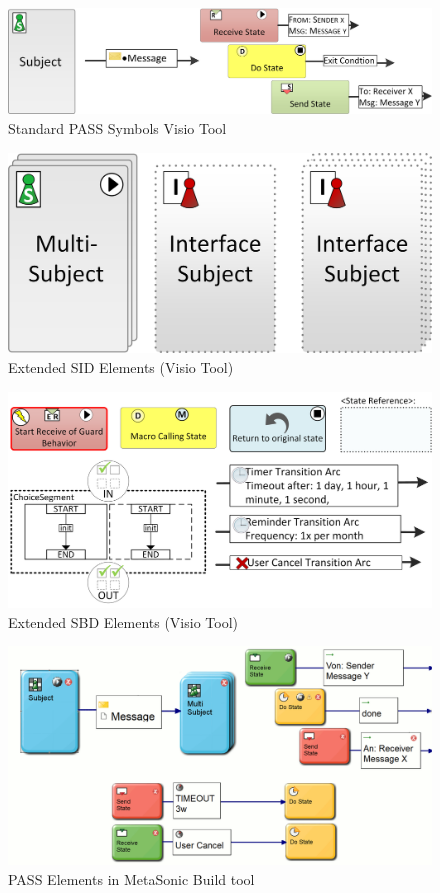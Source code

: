 \begin{figure}[htbp]
	\centering
	\includegraphics[width=0.9\linewidth]{Figures/Ontology/BaseElementsOverviewVisio.png}
	\caption[Standard PASS Symbols Visio Tool]{Standard PASS Symbols Visio Tool}
\end{figure}

\begin{figure}[htbp]
	\centering
	\includegraphics[width=0.45\linewidth]{Figures/Ontology/ExtendedElementsSIDVisio.png}
	\caption[Extended SID Elements (Visio Tool)]{Extended SID Elements (Visio Tool)}
\end{figure}

\begin{figure}[htbp]
	\centering
	\includegraphics[width=0.9\linewidth]{Figures/Ontology/ExtendedElementsSBDVisio.png}
	\caption[Extended SBD Elements (Visio Tool)]{Extended SBD Elements (Visio Tool)}
\end{figure}

\begin{figure}[htbp]
	\centering
	\includegraphics[width=0.9\linewidth]{Figures/Ontology/BaseElementsOverviewMetaSonic.png}
	\caption[]{PASS Elements in MetaSonic Build tool}
\end{figure}